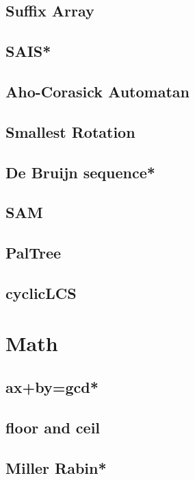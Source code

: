 \subsection{Suffix Array}

\subsection{SAIS*}

\subsection{Aho-Corasick Automatan}

\subsection{Smallest Rotation}

\subsection{De Bruijn sequence*} %

\subsection{SAM}

\subsection{PalTree}

\subsection{cyclicLCS}



\section{Math}
\subsection{ax+by=gcd*} %

\subsection{floor and ceil}

\subsection{Miller Rabin*} %

